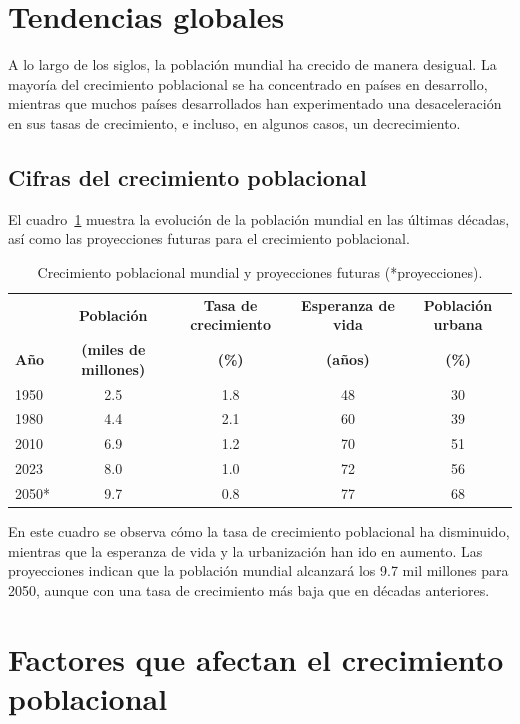 \section{Tendencias globales}

A lo largo de los siglos, la población mundial ha crecido de manera desigual. La mayoría del crecimiento poblacional se ha concentrado en países en desarrollo, mientras que muchos países desarrollados han experimentado una desaceleración en sus tasas de crecimiento, e incluso, en algunos casos, un decrecimiento.

\subsection{Cifras del crecimiento poblacional}

El cuadro~\ref{cuadro1} muestra la evolución de la población mundial en las últimas décadas, así como las proyecciones futuras para el crecimiento poblacional.

\begin{table}[!ht]
\sf\footnotesize\setlength\tabcolsep{4pt}
\centering
\begin{tabular}{l | c | c | c | c}
\toprule
& \textbf{Población} & \textbf{Tasa de crecimiento} & \textbf{Esperanza de vida} & \textbf{Población urbana} \\
\textbf{Año} & \textbf{(miles de millones)} & \textbf{(\%)} & \textbf{(años)} & \textbf{(\%)} \\
\midrule
1950 & 2.5 & 1.8 & 48 & 30 \\
\midrule
1980 & 4.4 & 2.1 & 60 & 39 \\
\midrule
2010 & 6.9 & 1.2 & 70 & 51 \\
\midrule
2023 & 8.0 & 1.0 & 72 & 56 \\
\midrule
2050* & 9.7 & 0.8 & 77 & 68\\
\bottomrule
\end{tabular}
\caption{Crecimiento poblacional mundial y proyecciones futuras (*proyecciones).}
\label{cuadro1}
\end{table}

En este cuadro se observa cómo la tasa de crecimiento poblacional ha disminuido, mientras que la esperanza de vida y la urbanización han ido en aumento. Las proyecciones indican que la población mundial alcanzará los 9.7 mil millones para 2050, aunque con una tasa de crecimiento más baja que en décadas anteriores.

\section{Factores que afectan el crecimiento poblacional}

